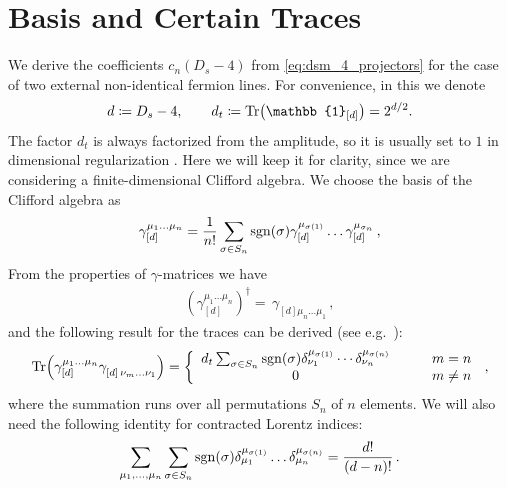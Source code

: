 \section{Basis and Certain Traces}
\label{sec:identities}

We derive the coefficients $c_n(D_s-4)$ from \cref{eq:dsm_4_projectors} for
the case of two external non-identical fermion lines.
For convenience, in this  we denote
\begin{equation}
  d \coloneqq D_s-4, \qquad  d_t \coloneqq \Tr(\mathbb{1}_{[d]})=2^{d/2}.
\end{equation}
The factor $d_t$ is always factorized from the amplitude, so it is usually set to $1$ in dimensional regularization \cite{Collins:1984xc}.
Here we will keep it for clarity, since we are considering a finite-dimensional Clifford algebra.
We choose the basis of the Clifford algebra as
\begin{align}\label{eq:basisGammaChainII}
\gamma_{[d]}^{\mu_1 \ldots \mu_n} = \frac{1}{n!} \sum_{ \sigma\in
S_n} \operatorname{sgn}(\sigma) \gamma_{[d]}^{\mu_{\sigma(1)}} \ldots
\gamma_{[d]}^{\mu_{\sigma_n}}\,,
\end{align}
From the properties of $\gamma$-matrices we have
\begin{eqnarray}
  (\gamma_{[d]}^{\mu_1 \ldots \mu_n} )^\dagger =\,
  \gamma_{[d]\mu_n \ldots \mu_1}^{\phantom{\mu}} \,,
\end{eqnarray}
and the following result for the traces can be derived (see e.g.\ \cite{Veltman:1988au}):
\begin{eqnarray}
  \label{eq:traceChain}
  \Tr(\gamma_{[d]}^{\mu_1 \ldots \mu_n} \gamma^{
    \phantom{\mu}}_{[d]\,\nu_m \ldots \nu_1})= 
    \left\{ \begin{array}{cc} d_t 
      \sum_{ \sigma\in  S_n} \operatorname{sgn}(\sigma)
      \delta^{\mu_{\sigma(1)}}_{\nu_1}\cdots\delta^{\mu_{\sigma(n)}}_
      {\nu_n} &\qquad m=n   \\
      0 &\qquad m\neq n\end{array}  
    \right. 
    \,,
  \end{eqnarray}
%
where the summation runs over all permutations $S_n$ of $n$ elements.
We will also need the following identity for contracted Lorentz indices:
\begin{eqnarray}
  \label{eqn:simpletrace}
  \sum_{\mu_1,\ldots,\mu_n} 
  \sum_{ \sigma\in  S_n} \operatorname{sgn}(\sigma)
  \delta^{\mu_{\sigma(1)}}_{\mu_1}\ldots
  \delta^{\mu_{\sigma(n)}}_{\mu_n}
  = \frac{d!}{(d-n)! }\,.
\end{eqnarray}

